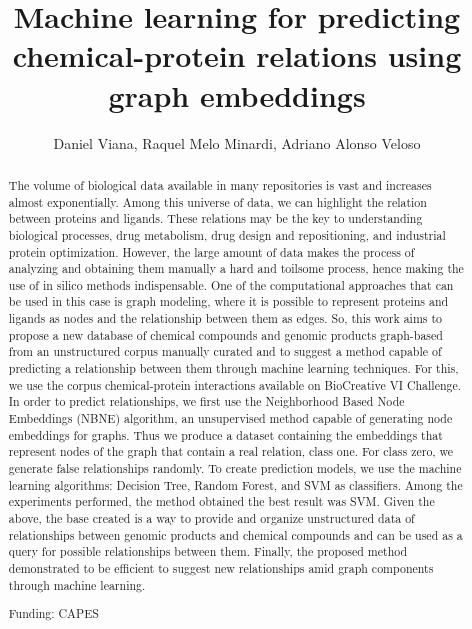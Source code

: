 \documentclass[twoside]{article}
\title{\vspace{-15mm}\fontsize{24pt}{10pt}\selectfont\textbf{ Machine learning for predicting chemical-protein relations using graph embeddings }} %
\author{ Daniel Viana, Raquel Melo Minardi, Adriano Alonso Veloso }
\affil{ UFMG }
\date{}
\begin{document}
  
  
  \maketitle %
  
  
  \thispagestyle{fancy} %
  
  
  \begin{abstract}
  The volume of biological data available in many repositories is vast and increases almost exponentially. Among this universe of data,  we can highlight the relation between proteins and ligands. These relations may be the key to understanding biological processes,  drug metabolism,  drug design and repositioning,  and industrial protein optimization. However,  the large amount of data makes the process of analyzing and obtaining them manually a hard and toilsome process,  hence making the use of in silico methods indispensable. One of the computational approaches that can be used in this case is graph modeling,  where it is possible to represent proteins and ligands as nodes and the relationship between them as edges. So,  this work aims to propose a new database of chemical compounds and genomic products graph-based from an unstructured corpus manually curated and to suggest a method capable of predicting a relationship between them through machine learning techniques. For this,  we use the corpus chemical-protein interactions available on BioCreative VI Challenge. In order to predict relationships,  we first use the Neighborhood Based Node Embeddings (NBNE) algorithm,  an unsupervised method capable of generating node embeddings for graphs. Thus we produce a dataset containing the embeddings that represent nodes of the graph that contain a real relation,  class one. For class zero,  we generate false relationships randomly. To create prediction models,  we use the machine learning algorithms: Decision Tree,  Random Forest,  and SVM as classifiers. Among the experiments performed,  the method obtained the best result was SVM. Given the above,  the base created is a way to provide and organize unstructured data of relationships between genomic products and chemical compounds and can be used as a query for possible relationships between them. Finally,  the proposed method demonstrated to be efficient to suggest new relationships amid graph components through machine learning.
  
  Funding: CAPES \\ 
  \end{abstract}
  
\end{document}
